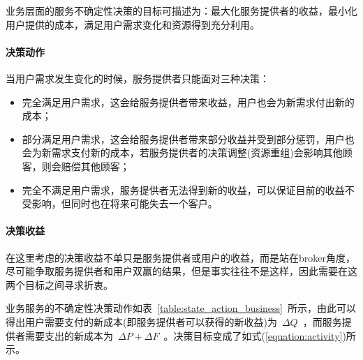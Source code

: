 业务层面的服务不确定性决策的目标可描述为：最大化服务提供者的收益，最小化用户提供的成本，满足用户需求变化和资源得到充分利用。

\setcounter{paragraph}{0}
\paragraph{决策动作}

当用户需求发生变化的时候，服务提供者只能面对三种决策：

\begin{itemize}

\item 
完全满足用户需求，这会给服务提供者带来收益，用户也会为新需求付出新的成本；

\item 部分满足用户需求，这会给服务提供者带来部分收益并受到部分惩罚，用户也会为新需求支付新的成本，若服务提供者的决策调整(资源重组)会影响其他顾客，则会赔偿其他顾客；

\item 完全不满足用户需求，服务提供者无法得到新的收益，可以保证目前的收益不受影响，但同时也在将来可能失去一个客户。

\end{itemize}

\paragraph{决策收益}

在这里考虑的决策收益不单只是服务提供者或用户的收益，而是站在broker角度，尽可能争取服务提供者和用户双赢的结果，但是事实往往不是这样，因此需要在这两个目标之间寻求折衷。

业务服务的不确定性决策动作如表~\ref{table:state_action_business}~所示，由此可以得出用户需要支付的新成本(即服务提供者可以获得的新收益)为~$\Delta Q$~，而服务提供者需要支出的新成本为~$\Delta P + \Delta F$~。决策目标变成了如式(\ref{equation:activity})所示。



